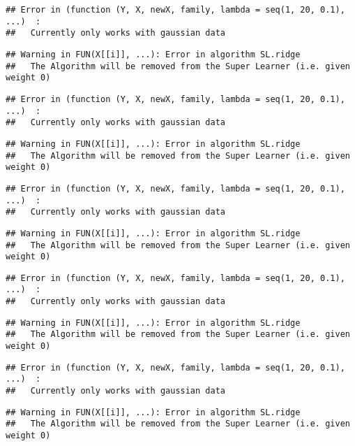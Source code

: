 \documentclass[
]{article}
\begin{document}
\begin{verbatim}
## Error in (function (Y, X, newX, family, lambda = seq(1, 20, 0.1), ...)  : 
##   Currently only works with gaussian data
\end{verbatim}

\begin{verbatim}
## Warning in FUN(X[[i]], ...): Error in algorithm SL.ridge 
##   The Algorithm will be removed from the Super Learner (i.e. given weight 0)
\end{verbatim}

\begin{verbatim}
## Error in (function (Y, X, newX, family, lambda = seq(1, 20, 0.1), ...)  : 
##   Currently only works with gaussian data
\end{verbatim}

\begin{verbatim}
## Warning in FUN(X[[i]], ...): Error in algorithm SL.ridge 
##   The Algorithm will be removed from the Super Learner (i.e. given weight 0)
\end{verbatim}

\begin{verbatim}
## Error in (function (Y, X, newX, family, lambda = seq(1, 20, 0.1), ...)  : 
##   Currently only works with gaussian data
\end{verbatim}

\begin{verbatim}
## Warning in FUN(X[[i]], ...): Error in algorithm SL.ridge 
##   The Algorithm will be removed from the Super Learner (i.e. given weight 0)
\end{verbatim}

\begin{verbatim}
## Error in (function (Y, X, newX, family, lambda = seq(1, 20, 0.1), ...)  : 
##   Currently only works with gaussian data
\end{verbatim}

\begin{verbatim}
## Warning in FUN(X[[i]], ...): Error in algorithm SL.ridge 
##   The Algorithm will be removed from the Super Learner (i.e. given weight 0)
\end{verbatim}

\begin{verbatim}
## Error in (function (Y, X, newX, family, lambda = seq(1, 20, 0.1), ...)  : 
##   Currently only works with gaussian data
\end{verbatim}

\begin{verbatim}
## Warning in FUN(X[[i]], ...): Error in algorithm SL.ridge 
##   The Algorithm will be removed from the Super Learner (i.e. given weight 0)
\end{verbatim}
\end{document}
